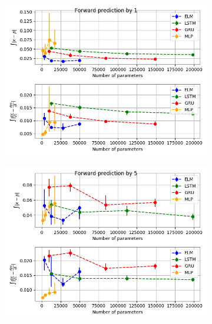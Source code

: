 \documentclass[11pt]{article}
\begin{document}
  \begin{figure}
    \begin{center}
      \begin{subfigure}{.48\textwidth}
        \includegraphics[width=\textwidth]{figures/mg1_scatter_1.png}
      \end{subfigure}
      \begin{subfigure}{.48\textwidth}
        \includegraphics[width=\textwidth]{figures/mg1_scatter_5.png}
      \end{subfigure}
      \begin{subfigure}{.48\textwidth}

\end{subfigure}
\end{center}
\end{figure}
\end{document}
